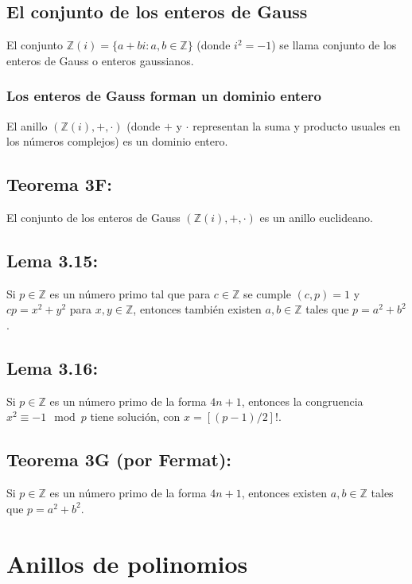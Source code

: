 \documentclass{article}
\begin{document}
\subsection*{\color{violet} El conjunto de los enteros de Gauss}

El conjunto $\mathbb{Z}(i)=\{a+bi: a,b\in\mathbb{Z}\}$ (donde $i^2=-1$) se llama conjunto de los enteros de Gauss o enteros gaussianos.

\subsubsection*{\color{teal} Los enteros de Gauss forman un dominio entero}

El anillo $(\mathbb{Z}(i),+,\cdot)$ (donde $+$ y $\cdot$ representan la suma y producto usuales en los números complejos) es un dominio entero.

\subsection*{\color{red} Teorema 3F:}

El conjunto de los enteros de Gauss $(\mathbb{Z}(i),+,\cdot)$ es un anillo euclideano.

\subsection*{\color{blue} Lema 3.15:}

Si $p\in\mathbb{Z}$ es un número primo tal que para $c\in\mathbb{Z}$ se cumple $(c,p)=1$ y $cp=x^2+y^2$ para $x,y\in\mathbb{Z}$, entonces también existen $a,b\in\mathbb{Z}$ tales que $p=a^2+b^2$.

\subsection*{\color{blue} Lema 3.16:}

Si $p\in\mathbb{Z}$ es un número primo de la forma $4n+1$, entonces la congruencia $x^2\equiv -1 \mod p$ tiene solución, con $x=[(p-1)/2]!$.

\subsection*{\color{red} Teorema 3G (por Fermat):}

Si $p\in\mathbb{Z}$ es un número primo de la forma $4n+1$, entonces existen $a,b\in\mathbb{Z}$ tales que $p=a^2+b^2$.

\newpage
\section{Anillos de polinomios}
\end{document}
